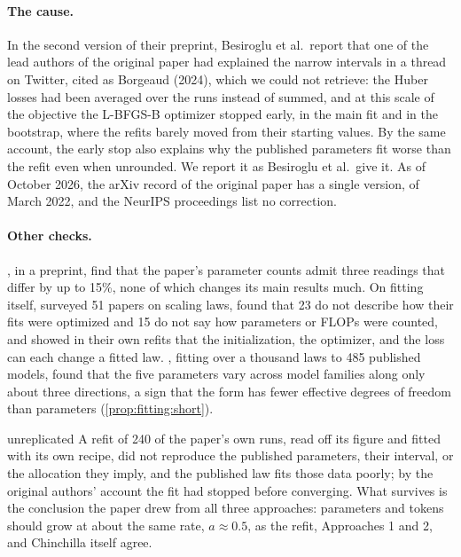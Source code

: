 \begin{refsection}
\paragraph{The cause.} In the second version of their preprint, Besiroglu et al.\ report that one of the lead authors of the original paper had explained the narrow intervals in a thread on Twitter, cited as Borgeaud (2024), which we could not retrieve: the Huber losses had been averaged over the runs instead of summed, and at this scale of the objective the L-BFGS-B optimizer stopped early, in the main fit and in the bootstrap, where the refits barely moved from their starting values. By the same account, the early stop also explains why the published parameters fit worse than the refit even when unrounded. We report it as Besiroglu et al.\ give it. As of October 2026, the arXiv record of the original paper has a single version, of March 2022, and the NeurIPS proceedings list no correction.

\paragraph{Other checks.} \Textcite{SchaefferEtAl2025}, in a preprint, find that the paper's parameter counts admit three readings that differ by up to 15\%, none of which changes its main results much. On fitting itself, \textcite{LiEtAl2025} surveyed 51 papers on scaling laws, found that 23 do not describe how their fits were optimized and 15 do not say how parameters or FLOPs were counted, and showed in their own refits that the initialization, the optimizer, and the loss can each change a fitted law. \Textcite{ChoshenEtAl2025}, fitting over a thousand laws to 485 published models, found that the five parameters vary across model families along only about three directions, a sign that the form has fewer effective degrees of freedom than parameters (\cref{prop:fitting:short}).

\begin{verdict}{unreplicated}
A refit of 240 of the paper's own runs, read off its figure and fitted with its own recipe, did not reproduce the published parameters, their interval, or the allocation they imply, and the published law fits those data poorly; by the original authors' account the fit had stopped before converging. What survives is the conclusion the paper drew from all three approaches: parameters and tokens should grow at about the same rate, $a\approx0.5$, as the refit, Approaches 1 and 2, and Chinchilla itself agree.
\end{verdict}


\end{refsection}
